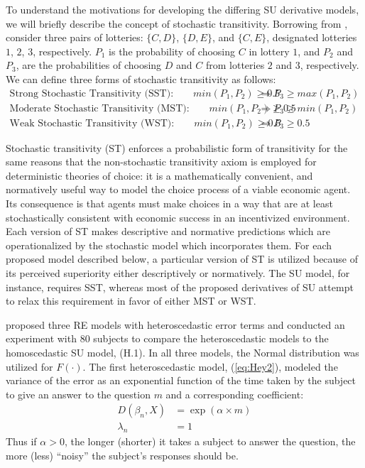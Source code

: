 To understand the motivations for developing the differing SU derivative models, we will briefly describe the concept of stochastic transitivity.
Borrowing from \textcite[210]{Wilcox2008}, consider three pairs of lotteries: $\{C,D\}$, $\{D,E\}$, and $\{C,E\}$, designated lotteries $1$, $2$, $3$, respectively.
$P_1$ is the probability of choosing $C$ in lottery $1$, and $P_2$ and $P_3$, are the probabilities of choosing $D$ and $C$ from lotteries $2$ and $3$, respectively.
We can define three forms of stochastic transitivity as follows:
\begin{align*}
	\text{Strong Stochastic Transitivity (SST):} \qquad \mathit{min}(P_1,P_2) \geq 0.5 &\Rightarrow P_3 \geq \mathit{max}(P_1,P_2) \\
	\text{Moderate Stochastic Transitivity (MST):} \qquad \mathit{min}(P_1,P_2) \geq 0.5 &\Rightarrow P_3 \geq \mathit{min}(P_1,P_2)\\
	\text{Weak Stochastic Transitivity (WST):} \qquad \mathit{min}(P_1,P_2) \geq 0.5 &\Rightarrow P_3 \geq 0.5
\end{align*}

Stochastic transitivity (ST) enforces a probabilistic form of transitivity for the same reasons that the non-stochastic transitivity axiom is employed for deterministic theories of choice: it is a mathematically convenient, and normatively useful way to model the choice process of a viable economic agent.
Its consequence is that agents must make choices in a way that are at least stochastically consistent with economic success in an incentivized environment.
Each version of ST makes descriptive and normative predictions which are operationalized by the stochastic model which incorporates them.
For each proposed model described below, a particular version of ST is utilized because of its perceived superiority either descriptively or normatively.
The SU model, for instance, requires SST, whereas most of the proposed derivatives of SU attempt to relax this requirement in favor of either MST or WST.

\textcite{Hey1995a} proposed three RE models with heteroscedastic error terms and conducted an experiment with 80 subjects to compare the heteroscedastic models to the homoscedastic SU model, (H.1).
In all three models, the Normal distribution was utilized for $F(\cdot)$.
The first heteroscedastic model, (\ref{eq:Hey2}), modeled the variance of the error as an exponential function of the time taken by the subject to give an answer to the question $m$ and a corresponding coefficient:
\begin{align*}
	\tag{H.2}
	\label{eq:Hey2}
	D(\beta_n,X) &= \exp(\alpha \times m)\\
	\lambda_n &= 1
\end{align*}
Thus if $\alpha > 0$, the longer (shorter) it takes a subject to answer the question, the more (less) \enquote{noisy} the subject's responses should be.

